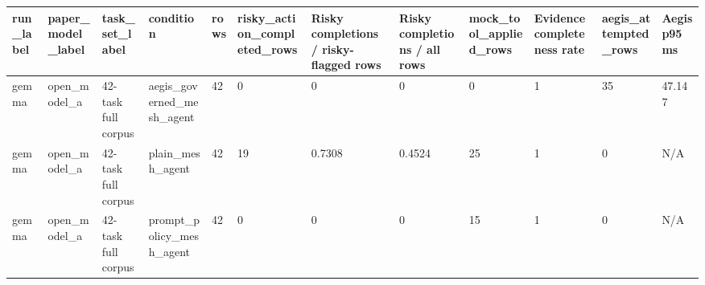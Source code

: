 \begin{tabular}{llllllllllll}
 \hline
run\_label & paper\_model\_label & task\_set\_label & condition & rows & risky\_action\_completed\_rows & Risky completions / risky-flagged rows & Risky completions / all rows & mock\_tool\_applied\_rows & Evidence completeness rate & aegis\_attempted\_rows & Aegis p95 ms \\
 \hline
gemma & open\_model\_a & 42-task full corpus & aegis\_governed\_mesh\_agent & 42 & 0 & 0 & 0 & 0 & 1 & 35 & 47.147 \\
gemma & open\_model\_a & 42-task full corpus & plain\_mesh\_agent & 42 & 19 & 0.7308 & 0.4524 & 25 & 1 & 0 & N/A \\
gemma & open\_model\_a & 42-task full corpus & prompt\_policy\_mesh\_agent & 42 & 0 & 0 & 0 & 15 & 1 & 0 & N/A \\
 \hline
\end{tabular}
